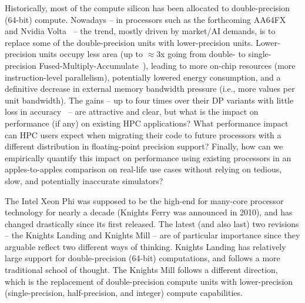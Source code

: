 Historically, most of the compute silicon has been allocated to double-precision (64-bit) compute.
Nowadays -- in processors such as the forthcoming AA64FX~\cite{yoshida_fujitsu_2018} and Nvidia
Volta~\cite{choquette_volta:_2018} -- the trend, mostly driven by market/AI demands, is to replace
some of the double-precision units with lower-precision units.
Lower-precision units occupy less area (up to $\approx$3x going from double- to single-precision
Fused-Multiply-Accumulate~\cite{pu_fpmax:_2016}), leading to more on-chip resources (more
instruction-level parallelism), potentially lowered energy consumption, and a definitive
decrease in external memory bandwidth pressure (i.e., more values per unit bandwidth).
The gains -- up to four times over their DP variants with little loss in
accuracy~\cite{haidar_harnessing_2018} -- are attractive and clear, but what is the impact on
performance (if any) on existing HPC applications? What performance impact can HPC users expect when migrating their code to future processors with a different distribution
in floating-point precision support? Finally, how can we empirically quantify this impact on
performance using existing processors in an apples-to-apples comparison on real-life use cases
without relying on tedious, slow, and potentially inaccurate simulators? %

The Intel Xeon Phi was supposed to be the high-end for many-core processor technology for nearly
a decade (Knights Ferry was announced in 2010), and has changed drastically since its first released.
The latest (and also last) two revisions -- the Knights Landing and Knights Mill -- are of
particular importance since they arguable reflect two different ways of thinking. Knights Landing
has relatively large support for double-precision (64-bit) computations, and follows a
more traditional school of thought. The Knights Mill follows a different direction, which is the replacement
of double-precision compute units with lower-precision (single-precision, half-precision, and integer)
compute capabilities.

